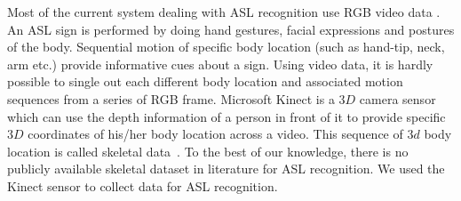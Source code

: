 \documentclass[10pt,twocolumn,letterpaper]{article}
\begin{document}

Most of the current system dealing with ASL recognition use RGB video data \cite{7177428,Ji:2013:CNN:2412386.2412939,Sun:2015:LSV:2753829.2629481}. An ASL sign is performed by doing hand gestures, facial expressions and postures of the body. Sequential motion of specific body location (such as hand-tip, neck, arm etc.) provide informative cues about a sign.
Using video data, it is hardly possible to single out each different body location and associated motion sequences from a series of RGB frame. Microsoft Kinect is a $3D$ camera sensor which can use the depth information of a person in front of it to provide specific $3D$ coordinates of his/her body location across a video. This sequence of $3d$ body location is called skeletal data~\cite{Zhang:2012:MKS:2225053.2225203}. 
To the best of our knowledge, there is no publicly available skeletal dataset in literature for ASL recognition. We used the Kinect sensor to collect data for ASL recognition. 
\end{document}
